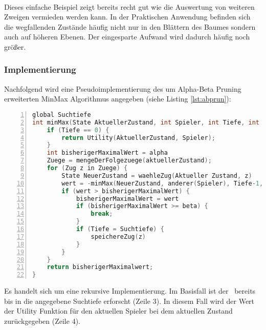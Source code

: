\paragraph{}  
Dieses einfache Beispiel zeigt bereits recht gut wie die Auswertung von weiteren Zweigen vermieden werden kann. In der Praktischen Anwendung befinden sich die wegfallenden Zustände häufig nicht nur in den Blättern des Baumes sondern auch auf höheren Ebenen. Der eingesparte Aufwand wird dadurch häufig noch größer.  

\subsubsection{Implementierung}
Nachfolgend wird eine Pseudoimplementierung des um Alpha-Beta Pruning erweiterten MinMax Algorithmus angegeben (siehe Listing \ref{lst:abprun}):
\begin{footnotesize}
\begin{lstlisting}[caption = {Pseudoimplementierung von Alpha-Beta Pruning}, language = cpp, captionpos = t , numbers=left, label={lst:abprun}]
global Suchtiefe
int minMax(State AktuellerZustand, int Spieler, int Tiefe, int alpha, int beta) {
	if (Tiefe == 0) {
		return Utility(AktuellerZustand, Spieler);	
	}
	int bisherigerMaximalWert = alpha
	Zuege = mengeDerFolgezuege(aktuellerZustand);
	for (Zug z in Zuege) {
		State NeuerZustand = waehleZug(Aktueller Zustand, z)
		wert = -minMax(NeuerZustand, anderer(Spieler), Tiefe-1, -beta, -bisherigerMaximalWert)
		if (wert > bisherigerMaximalWert) {
			bisherigerMaximalWert = wert
			if (bisherigerMaximalWert >= beta) {
				break;
			}
			if (Tiefe = Suchtiefe) {
				speichereZug(z)
			}
		}
	}
	return bisherigerMaximalwert;		
} 
\end{lstlisting}
\end{footnotesize}
Es handelt sich um eine rekursive Implementierung. Im Basisfall ist der \gtree\ bereits bis in die angegebene Suchtiefe erforscht (Zeile 3). In diesem Fall wird der Wert der Utility Funktion für den aktuellen Spieler bei dem aktuellen Zustand zurückgegeben (Zeile 4).

